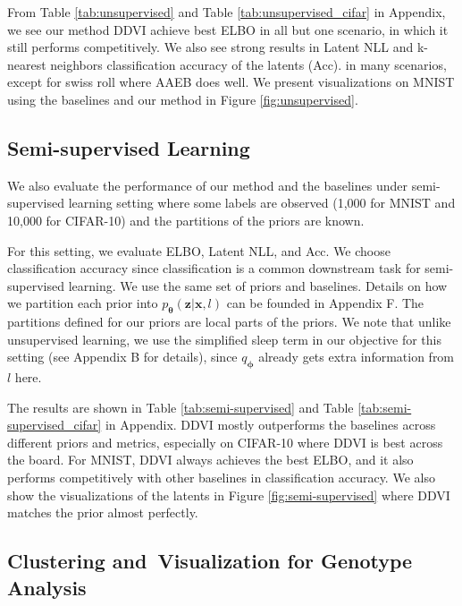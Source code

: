 \documentclass[letterpaper]{article} %
\newcommand{\bx}{\mathbf{x}}
\newcommand{\bz}{\mathbf{z}}
\newcommand{\btheta}{{\boldsymbol{\theta}}}
\let\oldtheta\theta
\renewcommand{\theta}{{\boldsymbol \oldtheta}}
\let\oldphi\phi
\renewcommand{\phi}{{\boldsymbol \oldphi}}
\begin{document}
From Table \ref{tab:unsupervised} and Table \ref{tab:unsupervised_cifar} in Appendix, we see our method DDVI achieve best ELBO in all but one scenario, in which it still performs competitively. We also see strong results in Latent NLL and k-nearest neighbors classification accuracy of the latents (Acc). in many scenarios, except for swiss roll where AAEB does well. 
We present visualizations on MNIST using the baselines and our method in Figure \ref{fig:unsupervised}.





\subsection{Semi-supervised Learning}

We also evaluate the performance of our method and the baselines under semi-supervised learning setting where some labels are observed (1,000 for MNIST and 10,000 for CIFAR-10) and the partitions of the priors are known.

For this setting, we evaluate ELBO, Latent NLL, and Acc. We choose classification accuracy since classification is a common downstream task for semi-supervised learning. We use the same set of priors and baselines. Details on how we partition each prior into $p_\btheta(\bz|\bx, l)$ can be founded in Appendix F. The partitions defined for our priors are local parts of the priors. We note that unlike unsupervised learning, we use the simplified sleep term in our objective for this setting (see Appendix B for details), since $q_\phi$ already gets extra information from $l$ here.

The results are shown in Table \ref{tab:semi-supervised} and Table \ref{tab:semi-supervised_cifar} in Appendix. DDVI mostly outperforms the baselines across different priors and metrics, especially on CIFAR-10 where DDVI is best across the board. 
For MNIST, DDVI always achieves the best ELBO, and it also performs competitively with other baselines in classification accuracy.
We also show the visualizations of the latents in Figure \ref{fig:semi-supervised} where DDVI matches the prior almost perfectly.


\subsection{Clustering and~Visualization for Genotype Analysis}
\end{document}
